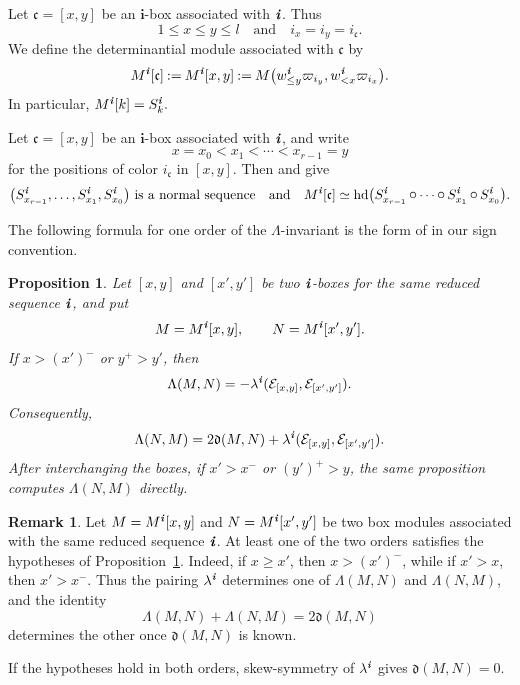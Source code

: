 \documentclass[12pt, leqno]{amsart}
\numberwithin{equation}{section}
\theoremstyle{plain}
\newtheorem{proposition}[lemma]{Proposition}
\theoremstyle{definition}
\newtheorem{remark}[lemma]{Remark}
\renewcommand{\ge}{\geqslant}
\newcommand{\head}{{\operatorname{hd}}}
\newcommand{\seteq}{\mathbin{:=}}
\newcommand{\conv}{\mathop{\mathbin{\mbox{\large $\circ$}}}}
\newcommand{\de}{\mathfrak{d}}
\newcommand{\ii}{ \textbf{\textit{i}}}
\newcommand{\frakc}{\mathfrak{c}}
\newcommand{\bfi}{\mathbf{i}}
\newcommand{\calE}{\mathcal{E}}
\newcommand{\scrC}{\mathscr{C}}
\newcommand{\qtq}[1][{and}]{\quad\text{{#1}}\quad}
\begin{document}
Let $\frakc=[x,y]$ be an \(\bfi\)-box associated with \(\ii\).  Thus
\[
1\leq x\leq y\leq l \qtq i_x=i_y=i_\frakc.
\]
We define the determinantial module associated with \(\frakc\) by
\begin{equation}\label{eq: determinantial module of a box}
M^\ii[\frakc] \seteq M^\ii[x,y] \seteq M\bigl( w_{\leq y}^\ii\varpi_{i_y}, w_{<x}^\ii\varpi_{i_x} \bigr).
\end{equation}
In particular, $M^\ii[k]=S_k^\ii.$ 


Let \(\frakc=[x,y]\) be an \(\bfi\)-box associated with \(\ii\), and
write
\[
x=x_0<x_1<\cdots<x_{r-1}=y
\]
for the positions of color \(i_\frakc\) in \([x,y]\).
 Then \cite[Proposition~4.3]{KKOP23F} and
\cite[Section~5.1.1]{KK24} give
\begin{equation}\label{eq: normal realization of box module}
\bigl(S_{x_{r-1}}^\ii,\ldots,S_{x_1}^\ii,S_{x_0}^\ii\bigr) \text{ is a normal sequence}
\qtq 
M^\ii[\frakc]
\simeq
\head\bigl( S_{x_{r-1}}^\ii\conv\cdots\conv S_{x_1}^\ii\conv S_{x_0}^\ii \bigr).
\end{equation} 
 

The following formula for one order of the \(\Lambda\)-invariant is the form of
\cite[Proposition~5.7, (5.5)--(5.6)]{KKOP23F} in our sign
convention.

\begin{proposition}\label{prop: KKOP directional box Lambda formula}
Let \([x,y]\) and \([x',y']\) be two \(\ii\)-boxes for the same
reduced sequence \(\ii\), and put
\[
 M=M^\ii[x,y],\qquad N=M^\ii[x',y'].
\]
If $x>(x')^-$ or $y^+>y'$, then
\begin{equation}\label{eq: KKOP directional box Lambda formula}
 \Lambda(M,N)=-\lambda^\ii(\calE_{[x,y]},\calE_{[x',y']}).
\end{equation}
Consequently,
\[
 \Lambda(N,M)=2\de(M,N)
 +\lambda^\ii(\calE_{[x,y]},\calE_{[x',y']}).
\]
After interchanging the boxes, if
$ x'>x^-$ or $(y')^+>y$,
the same proposition computes \(\Lambda(N,M)\) directly.
\end{proposition}

 

\begin{remark}\label{rmk: one Lambda is computable}
Let \(M=M^\ii[x,y]\) and \(N=M^\ii[x',y']\) be two box modules
associated with the same reduced sequence \(\ii\).
At least one of the two orders satisfies the hypotheses of
Proposition~\ref{prop: KKOP directional box Lambda formula}.
Indeed, if \(x\ge x'\), then \(x>(x')^-\), while if \(x'>x\),
then \(x'>x^-\).
Thus the pairing \(\lambda^\ii\) determines one of
\(\Lambda(M,N)\) and \(\Lambda(N,M)\), and the identity
\[
\Lambda(M,N)+\Lambda(N,M)=2\de(M,N)
\]
determines the other once \(\de(M,N)\) is known.

If the hypotheses hold in both orders, skew-symmetry of
\(\lambda^\ii\) gives \(\de(M,N)=0\).
\end{remark}
\end{document}
